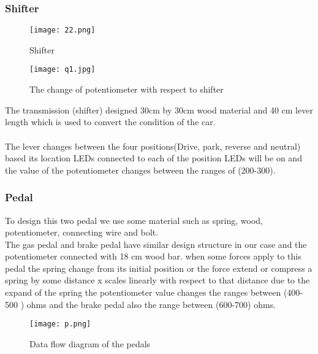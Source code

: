 \documentclass[12pt,a4paper]{article}
\begin{document}
\begin{center}
\begin{center}
\begin{center}
\subsubsection{Shifter}
\begin{figure}[H]
	\centering 
	\texttt{[image: 22.png]}
	\caption{Shifter}	
\end{figure}

\begin{figure}[H]
	\centering 
	\texttt{[image: q1.jpg]}
	\caption{The change of potentiometer with respect to shifter}	
\end{figure}

The transmission (shifter) designed 30cm by 30cm wood material and 40 cm lever length which is used to convert the condition of the car.\\
\\
The lever changes between the four positions(Drive, park, reverse and  neutral) based its location LEDs connected to each of the position LEDs will be on and  the value of the potentiometer changes between the ranges of (200-300).
\subsubsection{Pedal}
To design this two pedal we use some material such as spring, wood, potentiometer, connecting wire and bolt.
\\
The gas pedal and brake pedal have similar design structure in our case and the potentiometer connected with 18 cm wood bar. when some forces apply to this pedal the spring  change from its initial position or the force extend or compress a spring by some distance x scales linearly with respect to that distance due to the expand of the spring the potentiometer value changes the ranges between (400-500 ) ohms and the brake pedal also the range between (600-700) ohms.
\begin{figure}[H]
	\centering 
	\texttt{[image: p.png]}
	\caption{Data flow diagram of the pedals}	
\end{figure}



\end{center}
\end{center}
\end{center}
\end{document}
